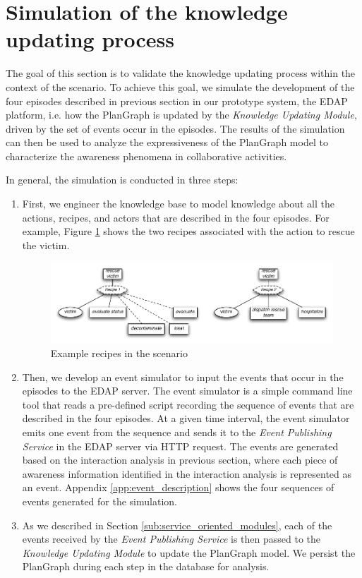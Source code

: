 \section{Simulation of the knowledge updating process} %
\label{sec:simulating_the_knowledge_updating}
The goal of this section is to validate the knowledge updating process within the context of the scenario. To achieve this goal, we simulate the development of the four episodes described in previous section in our prototype system, the EDAP platform, i.e. how the PlanGraph is updated by the \emph{Knowledge Updating Module}, driven by the set of events occur in the episodes. The results of the simulation can then be used to analyze the expressiveness of the PlanGraph model to characterize the awareness phenomena in collaborative activities. 

In general, the simulation is conducted in three steps:

\begin{enumerate}
	\item First, we engineer the knowledge base to model knowledge about all the actions, recipes, and actors that are described in the four episodes. For example, Figure \ref{fig:example_recipes_in_scenario} shows the two recipes associated with the action to rescue the victim.
	\begin{figure}[htbp] %
   		\centering
   		\includegraphics[width=5.8in]{example_recipes_in_scenario.pdf} 
   		\caption{Example recipes in the scenario}
   		\label{fig:example_recipes_in_scenario}
	\end{figure}
	\item Then, we develop an event simulator to input the events that occur in the episodes to the EDAP server. The event simulator is a simple command line tool that reads a pre-defined script recording the sequence of events that are described in the four episodes. At a given time interval, the event simulator emits one event from the sequence and sends it to the \emph{Event Publishing Service} in the EDAP server via HTTP request. The events are generated based on the interaction analysis in previous section, where each piece of awareness information identified in the interaction analysis is represented as an event. Appendix \ref{app:event_description} shows the four sequences of events generated for the simulation.
	\item As we described in Section \ref{sub:service_oriented_modules}, each of the events received by the \emph{Event Publishing Service} is then passed to the \emph{Knowledge Updating Module} to update the PlanGraph model. We persist the PlanGraph during each step in the database for analysis.
\end{enumerate}

